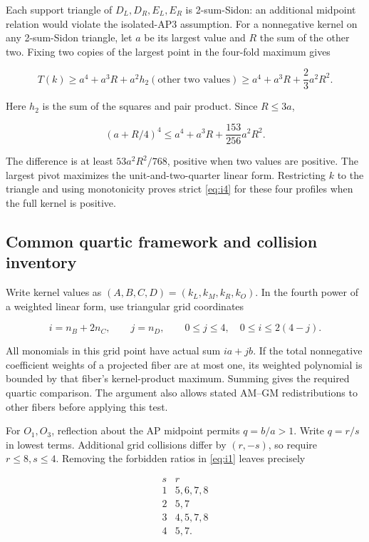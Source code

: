 Each support triangle of \(D_L,D_R,E_L,E_R\) is 2-sum-Sidon: an additional
midpoint relation would violate the isolated-AP3 assumption. For a nonnegative
kernel on any 2-sum-Sidon triangle, let \(a\) be its largest value and \(R\)
the sum of the other two. Fixing two copies of the largest point in the
four-fold maximum gives

\[
T(k)\ge a^4+a^3R+a^2h_2(\text{other two values})
\ge a^4+a^3R+\frac23a^2R^2.
\]

Here \(h_2\) is the sum of the squares and pair product. Since \(R\le3a\),

\[
(a+R/4)^4\le a^4+a^3R+\frac{153}{256}a^2R^2.
\]

The difference is at least \(53a^2R^2/768\), positive when two values are
positive. The largest pivot maximizes the unit-and-two-quarter linear form.
Restricting \(k\) to the triangle and using monotonicity proves strict \eqref{eq:i4}
for these four profiles when the full kernel is positive.

\subsection{Common quartic framework and collision inventory}

Write kernel values as \((A,B,C,D)=(k_L,k_M,k_R,k_O)\). In the fourth
power of a weighted linear form, use triangular grid coordinates

\[
i=n_B+2n_C,\qquad j=n_D,\qquad
0\le j\le4,\quad0\le i\le2(4-j).
\]

All monomials in this grid point have actual sum \(ia+jb\). If the total
nonnegative coefficient weights of a projected fiber are at most one, its
weighted polynomial is bounded by that fiber's kernel-product maximum.
Summing gives the required quartic comparison. The argument also allows
stated AM--GM redistributions to other fibers before applying this test.

For \(O_1,O_3\), reflection about the AP midpoint permits \(q=b/a>1\).
Write \(q=r/s\) in lowest terms. Additional grid collisions differ by
\((r,-s)\), so require \(r\le8,s\le4\). Removing the forbidden ratios
in \eqref{eq:i1} leaves precisely

\begin{equation}\label{eq:i9}
\begin{array}{c|l}
s& r\\\hline
1&5,6,7,8\\
2&5,7\\
3&4,5,7,8\\
4&5,7.
\end{array}
\end{equation}

